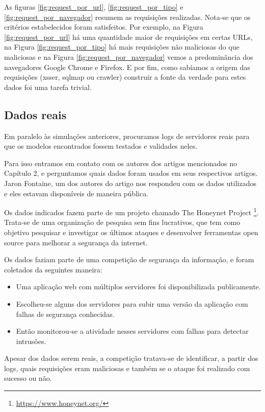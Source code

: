 As figuras \ref{fig:request_por_url}, \ref{fig:request_por_tipo} e \ref{fig:request_por_navegador} resumem 
as requisições realizadas. Nota-se que os critérios estabelecidos foram satisfeitos. Por exemplo, na
Figura \ref{fig:request_por_url} há uma quantidade maior de requisições em certas URLs, na Figura 
\ref{fig:request_por_tipo} há mais requisições não maliciosas do que maliciosas e 
na Figura \ref{fig:request_por_navegador} vemos a predominância dos navegadores Google Chrome e 
Firefox. E por fim, como 
sabíamos a origem das requisições (xsser, sqlmap ou crawler) construir a fonte da verdade para estes 
dados foi uma tarefa trivial.

\subsection{Dados reais}

Em paralelo às simulações anteriores, procuramos logs de servidores reais para que os modelos 
encontrados fossem testados e validades neles. 

Para isso entramos em contato com os autores dos artigos mencionados no Capítulo 2, e 
perguntamos quais dados foram usados em seus respectivos artigos. Jaron Fontaine, um dos autores
do artigo \cite{ref:art6} nos respondeu com os dados utilizados e eles estavam disponíveis de
maneira pública. 

Os dados indicados fazem parte de um projeto chamado The Honeynet Project \footnote{\url{https://www.honeynet.org/}}. 
Trata-se de uma organização de pesquisa 
sem fins lucrativos, que tem como objetivo pesquisar e investigar os últimos ataques e desenvolver
ferramentas open source para melhorar a segurança da internet.

Os dados faziam parte de uma competição de segurança da informação, e foram coletados da seguintes maneira:

\begin{itemize}
    \item Uma aplicação web com múltiplos servidores foi disponibilizada publicamente.
    \item Escolheu-se alguns dos servidores para subir uma versão da aplicação 
    com falhas de segurança conhecidas.
    \item Então monitorou-se a atividade nesses servidores com falhas para detectar intrusões.
\end{itemize}

Apesar dos dados serem reais, a competição tratava-se de identificar, a partir dos logs, quais requisições 
eram maliciosas e também se o ataque foi realizado com sucesso ou não. 

